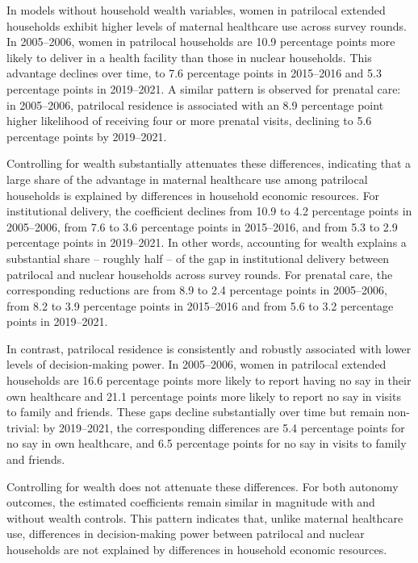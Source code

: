 \documentclass[10pt,twoside,reqno]{article}
\begin{document}
In models without household wealth variables, women in patrilocal extended households exhibit higher levels of maternal healthcare use across survey rounds. In 2005–2006, women in patrilocal households are 10.9 percentage points more likely to deliver in a health facility than those in nuclear households. This advantage declines over time, to 7.6 percentage points in 2015–2016 and 5.3 percentage points in 2019–2021. A similar pattern is observed for prenatal care: in 2005–2006, patrilocal residence is associated with an 8.9 percentage point higher likelihood of receiving four or more prenatal visits, declining to 5.6 percentage points by 2019–2021.

Controlling for wealth substantially attenuates these differences, indicating that a large share of the advantage in maternal healthcare use among patrilocal households is explained by differences in household economic resources. For institutional delivery, the coefficient declines from 10.9 to 4.2 percentage points in 2005–2006, from 7.6 to 3.6 percentage points in 2015–2016, and from 5.3 to 2.9 percentage points in 2019–2021. In other words, accounting for wealth explains a substantial share – roughly half – of the gap in institutional delivery between patrilocal and nuclear households across survey rounds. For prenatal care, the corresponding reductions are from 8.9 to 2.4 percentage points in 2005–2006, from 8.2 to 3.9 percentage points in 2015–2016 and from 5.6 to 3.2 percentage points in 2019–2021.

In contrast, patrilocal residence is consistently and robustly associated with lower levels of decision-making power. In 2005–2006, women in patrilocal extended households are 16.6 percentage points more likely to report having no say in their own healthcare and 21.1 percentage points more likely to report no say in visits to family and friends. These gaps decline substantially over time but remain non-trivial: by 2019–2021, the corresponding differences are 5.4 percentage points for no say in own healthcare, and 6.5 percentage points for no say in visits to family and friends. 

Controlling for wealth does not attenuate these differences. For both autonomy outcomes, the estimated coefficients remain similar in magnitude with and without wealth controls. This pattern indicates that, unlike maternal healthcare use, differences in decision-making power between patrilocal and nuclear households are not explained by differences in household economic resources.
\end{document}
